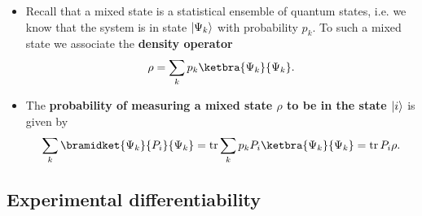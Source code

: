 \documentclass[10pt]{article}
\DeclarePairedDelimiter\ket{\lvert}{\rangle}
\DeclareMathOperator{\tr}{tr}
\begin{document}
            \begin{itemize}
                \item Recall that a mixed state is a statistical ensemble of quantum states, i.e. we know that the system is in state $\ket{\Psi_k}$ with probability $p_k$.
                    To such a mixed state we associate the \textbf{density operator}
                    \begin{equation*}
                        \rho=\sum_k p_k\ketbra{\Psi_k}{\Psi_k}.
                    \end{equation*}
                \item The \textbf{probability of measuring a mixed state $\rho$ to be in the state $\ket{i}$} is given by
                    \begin{equation*}
                        \sum_k\bramidket{\Psi_k}{P_i}{\Psi_k} = \tr\sum_k p_kP_i\ketbra{\Psi_k}{\Psi_k} = \tr P_i\rho.
                    \end{equation*}

            \end{itemize}

        \subsection{Experimental differentiability}
\end{document}
